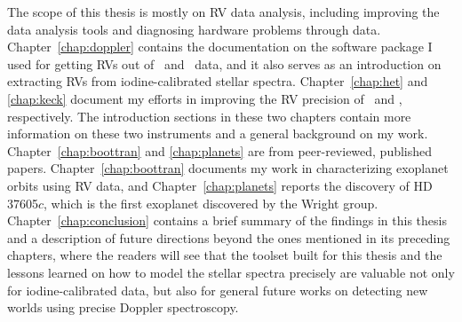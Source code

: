 The scope of this thesis is mostly on RV data analysis, including
improving the data analysis tools and diagnosing hardware problems
through data. Chapter~\ref{chap:doppler} contains the documentation on
the software package I used for getting RVs out of \het\ and \keck\
data, and it also serves as an introduction on extracting RVs from
iodine-calibrated stellar spectra. Chapter~\ref{chap:het} and
\ref{chap:keck} document my efforts in improving the RV precision of
\het\ and \keck, respectively. The introduction sections in these two
chapters contain more information on these two instruments and a
general background on my work. Chapter~\ref{chap:boottran} and
\ref{chap:planets} are from peer-reviewed, published
papers. Chapter~\ref{chap:boottran} documents my work in
characterizing exoplanet orbits using RV data, and
Chapter~\ref{chap:planets} reports the discovery of HD 37605$c$, which
is the first exoplanet discovered by the Wright
group. Chapter~\ref{chap:conclusion} contains a brief summary of the
findings in this thesis and a description of future directions beyond
the ones mentioned in its preceding chapters, where the readers will
see that the toolset built for this thesis and the lessons learned on
how to model the stellar spectra precisely are valuable not only for
iodine-calibrated data, but also for general future works on detecting
new worlds using precise Doppler spectroscopy.
